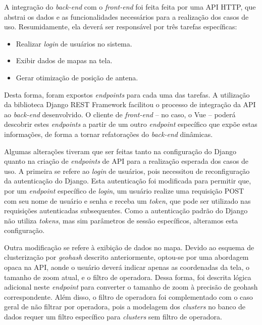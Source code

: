 \documentclass[]{politex}
\begin{document}
A integração do \textit{back-end} com o \textit{front-end} foi feita feita por uma API HTTP, que
abstrai os dados e as funcionalidades necessários para a realização dos casos de
uso. Resumidamente, ela deverá ser responsável por três tarefas específicas:

\begin{itemize}
\item Realizar \textit{login} de usuários no sistema.
\item Exibir dados de mapas na tela.
\item Gerar otimização de posição de antena.
\end{itemize}

Desta forma, foram expostos \textit{endpoints} para cada uma das tarefas. A utilização
da biblioteca Django REST Framework facilitou o processo de integração da API
ao \textit{back-end} desenvolvido. O cliente de \textit{front-end} -- no caso, o Vue -- poderá descobrir
estes \textit{endpoints} a partir de um outro \textit{endpoint} específico que expõe estas informações,
de forma a tornar refatorações do \textit{back-end} dinâmicas.

Algumas alterações tiveram que ser feitas tanto na configuração do Django quanto
na criação de \textit{endpoints} de API para a realização esperada dos casos de uso. A primeira
se refere ao \textit{login} de usuários, pois necessitou de reconfiguração da
autenticação do Django. Esta autenticação foi modificada para permitir que, por
um \textit{endpoint} específico de \textit{login}, um usuário realize uma requisição POST com seu
nome de usuário e senha e receba um \textit{token}, que pode ser utilizado nas requisições
autenticadas subsequentes. Como a autenticação padrão do Django não utiliza
\textit{tokens}, mas sim parâmetros de sessão específicos, alteramos esta configuração.

Outra modificação se refere à exibição de dados no mapa. Devido ao esquema de
clusterização por \textit{geohash} descrito anteriormente, optou-se por uma abordagem
opaca na API, aonde o usuário deverá indicar apenas as coordenadas da tela, o
tamanho de zoom atual, e o filtro de operadora. Dessa forma, foi descrita
lógica adicional neste \textit{endpoint} para converter o tamanho de zoom à precisão de
geohash correspondente. Além disso, o filtro de operadora foi complementado com
o caso geral de não filtrar por operadora, pois a modelagem dos \textit{clusters} no
banco de dados requer um filtro específico para \textit{clusters} sem filtro de
operadora.
\end{document}
